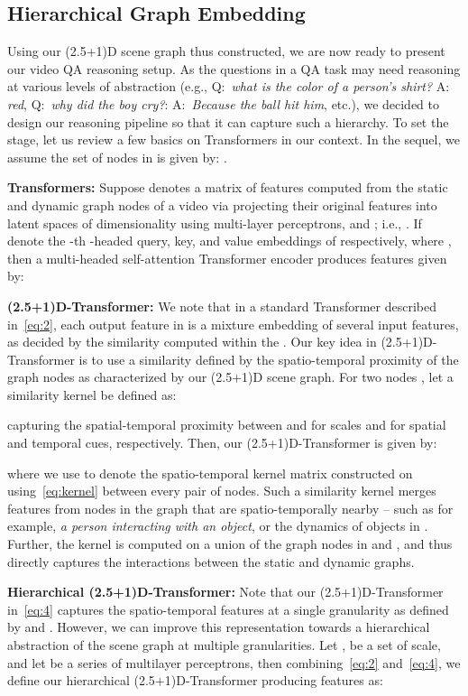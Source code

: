 \documentclass[letterpaper]{article} \usepackage{aaai22}  \usepackage{times}  \usepackage{helvet}  \usepackage{courier}  \usepackage[hyphens]{url}  \usepackage{graphicx} \urlstyle{rm} \def\UrlFont{\rm}  \usepackage{natbib}  \usepackage{caption} \DeclareCaptionStyle{ruled}{labelfont=normalfont,labelsep=colon,strut=off} \frenchspacing  \setlength{\pdfpagewidth}{8.5in}  \setlength{\pdfpageheight}{11in}  \usepackage{algorithm}
\newcommand{\name}{(2.5+1)D\xspace}
\newcommand{\nameTxr}{(2.5+1)D-Transformer\xspace}
\begin{document}
\subsection{Hierarchical Graph Embedding}
Using our \name scene graph thus constructed, we are now ready to present our video QA reasoning setup. As the questions in a QA task may need reasoning at various levels of abstraction (e.g., Q:~\emph{what is the color of a person's shirt?} A: \emph{red}, Q:~\emph{why did the boy cry?}: A:~\emph{Because the ball hit him}, etc.), we decided to design our reasoning pipeline so that it can capture such a hierarchy. To set the stage, let us review a few basics on Transformers in our context. In the sequel, we assume the set of nodes in  is given by: .

\noindent\textbf{Transformers:} Suppose  denotes a matrix of features computed from the static and dynamic graph nodes of a video  via projecting their original features into latent spaces of dimensionality  using multi-layer perceptrons,  and ; i.e., . If  denote the -th -headed query, key, and value embeddings of  respectively, where , then a multi-headed self-attention Transformer encoder produces features  given by:



\noindent\textbf{\nameTxr:}
We note that in a standard Transformer described in~\eqref{eq:2}, each output feature in  is a mixture embedding of several input features, as decided by the similarity computed within the .
Our key idea in \nameTxr is to use a similarity defined by the spatio-temporal proximity of the graph nodes as characterized by our \name scene graph. For two nodes , let a similarity kernel  be defined as:

capturing the spatial-temporal proximity between  and  for scales  and  for spatial and temporal cues, respectively. Then, our \nameTxr is given by:

where we use  to denote the spatio-temporal kernel matrix constructed on  using~\eqref{eq:kernel} between every pair of nodes. Such a similarity kernel merges features from nodes in the graph that are spatio-temporally nearby -- such as for example, \emph{a person interacting with an object}, or the dynamics of objects in . Further, the kernel is computed on a union of the graph nodes in  and , and thus directly captures the interactions between the static and dynamic graphs. 

\noindent\textbf{Hierarchical \nameTxr:}
Note that our \nameTxr in~\eqref{eq:4} captures the spatio-temporal features at a single granularity as defined by  and . However, we can improve this representation towards a hierarchical abstraction of the scene graph at multiple granularities. Let ,  be a set of scale, and let  be a series of multilayer perceptrons, then combining~\eqref{eq:2} and~\eqref{eq:4}, we define our hierarchical \nameTxr producing features  as:
\end{document}
